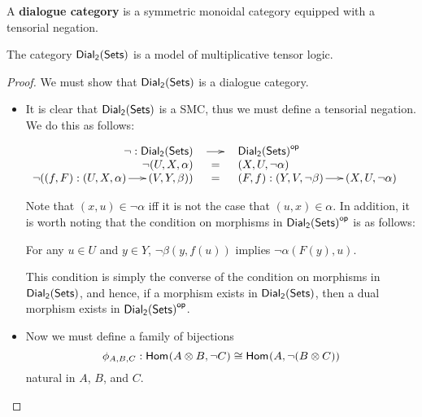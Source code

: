 \begin{definition}
  \label{def:dialogue-cat}
  A \textbf{dialogue category} is a symmetric monoidal category
  equipped with a tensorial negation.
\end{definition}

\begin{lemma}
  \label{lemma:dial-tensorial-model}
  The category $\mathsf{Dial_2}(\mathsf{Sets})$ is a model of multiplicative tensor logic.
\end{lemma}
\begin{proof}
  We must show that $\mathsf{Dial_2}(\mathsf{Sets})$ is a dialogue category.
  \begin{itemize}
  \item It is clear that $\mathsf{Dial_2}(\mathsf{Sets})$ is a SMC, thus we must define a
    tensorial negation.  We do this as follows:
    \begin{center}
      \begin{math}
        \begin{array}{rcl}
          \lnot : \mathsf{Dial_2}(\mathsf{Sets}) & \to & \mathcal{\mathsf{Dial_2}(\mathsf{Sets})}^{\mathsf{op}}\\
          \lnot (U,X,\alpha) & = & (X,U,\lnot \alpha)\\
          \lnot ((f,F) : (U,X,\alpha) \to (V,Y,\beta)) & = & (F,f) : (Y,V,\lnot \beta) \to (X,U,\lnot \alpha)\\
        \end{array}
      \end{math}
    \end{center}
    Note that $(x,u) \in \lnot \alpha$ iff it is not the case that
    $(u,x) \in \alpha$.  In addition, it is worth noting that the
    condition on morphisms in $\mathcal{\mathsf{Dial_2}(\mathsf{Sets})}^{\mathsf{op}}$ is as follows:
    \begin{center}
      For any $u \in U$ and $y \in Y$, $\lnot \beta(y,f(u))$ implies $\lnot \alpha(F(y),u)$.
    \end{center}
    This condition is simply the converse of the condition on
    morphisms in $\mathsf{Dial_2}(\mathsf{Sets})$, and hence, if a morphism exists in $\mathsf{Dial_2}(\mathsf{Sets})$,
    then a dual morphism exists in $\mathcal{\mathsf{Dial_2}(\mathsf{Sets})}^{\mathsf{op}}$.

  \item Now we must define a family of bijections \[\phi_{A,B,C} :
    \mathsf{Hom}_{\mathcal{}}(A \otimes B,\lnot C) \cong \mathsf{Hom}_{\mathcal{}}(A,\lnot (B \otimes
      C))\] natural in $A$, $B$, and $C$.


\end{itemize}
\end{proof}
